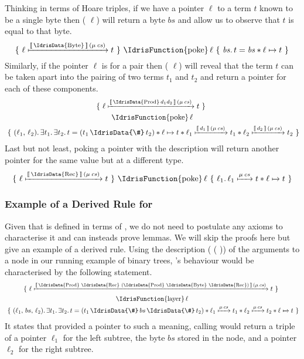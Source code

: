 Thinking in terms of Hoare triples, if we have a pointer
$\ell$ to a term $t$ known to be a single byte then
( $\ell$)
will return a byte $bs$ and allow us to observe that $t$ is
equal to that byte.
\[
\Hoare
    {\Pointer{\ell}{\Meaning{\text{\IdrisData{Byte}}}{cs}}{t}}
    {\text{\IdrisFunction{poke}}\,\ell}
    {\mathit{bs}}
    {t = \mathit{bs} \ast \ell \mapsto t}
\]
Similarly, if the pointer $\ell$ is for a pair then
( $\ell$) will
reveal that the term $t$ can be taken apart into the pairing
of two terms $t_1$ and $t_2$ and
return a pointer for each of these components.
\begin{gather*}
\Hoare
    {\Pointer{\ell}{\Meaning{\text{\IdrisData{Prod}}\, d_1 d_2}{cs}}{t}}
    {\\\text{\IdrisFunction{poke}}\,\ell\\}
    {(\ell_1,\, \ell_2)}
    {\exists t_1.\, \exists t_2.\, t = (t_1 \,\text{\IdrisData{\#}}\, t_2)
        \ast \ell \mapsto t \ast \Pointer{\ell_1}{\Meaning{d_1}{cs}}{t_1} \ast \Pointer{\ell_2}{\Meaning{d_2}{cs}}{t_2}}
\end{gather*}
Last but not least, poking a pointer with the 
description will return another pointer for the same value but
at a different type.
\[
\Hoare
    {\Pointer{\ell}{\Meaning{\text{\IdrisData{Rec}}}{cs}}{t}}
    {\text{\IdrisFunction{poke}}\,\ell}
    {\ell_1}
    {\Pointer{\ell_1}{\Mu{cs}}{t} \ast \Pointer{\ell}{}{t}}
\]

\subsubsection{Example of a Derived Rule for }

Given that  is defined in terms of ,
we do not need to postulate any axioms to characterise it and can insteads
prove lemmas. We will skip the proofs here but give an example of a derived
rule.
%
Using the description (  (  ))
of the arguments to a node in our running example of binary trees,
's behaviour would be characterised by the following
statement.
\begin{gather*}
\Hoare
    {\Pointer{\ell}{\Meaning{\text{\IdrisData{Prod} \IdrisData{Rec} (\IdrisData{Prod} \IdrisData{Byte} \IdrisData{Rec})}}{cs}}{t}}
    {\\\text{\IdrisFunction{layer}}\,\ell\\}
    {(\ell_1,\, bs,\, \ell_2)}
    {\exists t_1.\, \exists t_2.\,
      t = (t_1 \,\text{\IdrisData{\#}}\, bs \,\text{\IdrisData{\#}}\, t_2)
      \ast \Pointer{\ell_1}{\Mu{cs}}{t_1}
      \ast \Pointer{\ell_2}{\Mu{cs}}{t_2}
      \ast \Pointer{\ell}{}{t}}
\end{gather*}
It states that provided a pointer to such a meaning,
calling  would
return a triple of
a pointer $\ell_1$ for the left subtree,
the byte $\mathit{bs}$ stored in the node,
and a pointer $\ell_2$ for the right subtree.

